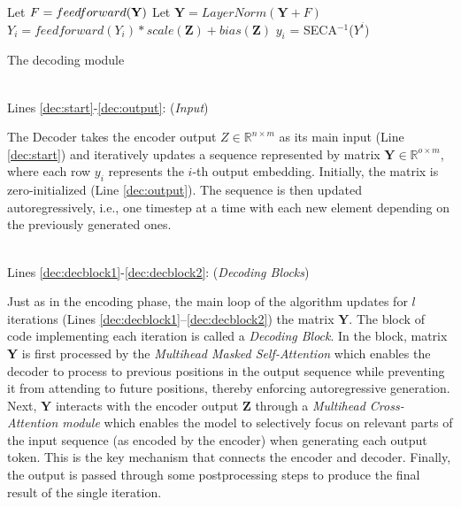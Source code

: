 \documentclass[algorithms,article,submit,pdftex,moreauthors]{Definitions/mdpi}
\begin{document}
\begin{algorithm2e}
{{                \label{dec:norm2}
                Let $F = feedforward({\bf Y})$\;
                \label{dec:ffn}
                Let $\textbf{Y} = LayerNorm(\textbf{Y} + F)$\;
                \label{dec:norm3}
            } \label{dec:decblock2}
            $Y_i = feedforward(Y_i)  * scale(\textbf{Z}) + bias(\textbf{Z})$\; \label{dec:finalproj}
            $y_i$ = SECA$^{-1}$($Y^i$) \;
        } \label{dec:outer2}                     
    	\caption{The decoding module} 
    \label{algo:decoding}
\end{algorithm2e}

~\\Lines \ref{dec:start}-\ref{dec:output}: (\textit{Input})

The Decoder takes the encoder output $Z \in \mathbb{R}^{n \times m}$ as its main input (Line \ref{dec:start}) and iteratively updates a sequence represented by matrix $\textbf{Y} \in \mathbb{R}^{o \times m}$, where each row $y_i$ represents the $i$-th output embedding. Initially, the matrix is zero-initialized (Line \ref{dec:output}). The sequence is then updated autoregressively, i.e., one timestep at a time with each new element depending on the previously generated ones.

~\\Lines \ref{dec:decblock1}-\ref{dec:decblock2}: (\textit{Decoding Blocks})

Just as in the encoding phase, the main loop of the algorithm updates for $l$ iterations (Lines \ref{dec:decblock1}–\ref{dec:decblock2}) the matrix $\textbf{Y}$. The block of code implementing each iteration is called a \textit{Decoding Block}.
In the block, matrix {\bf Y} is first processed by the {\em Multihead Masked Self-Attention} which enables the decoder to process to previous positions in the output sequence while preventing it from attending to future positions, thereby enforcing autoregressive generation.
Next, $\mathbf{Y}$ interacts with the encoder output $\mathbf{Z}$ through a {\em Multihead Cross-Attention module} which enables the model to selectively focus on relevant parts of the input sequence (as encoded by the encoder) when generating each output token. This is the key mechanism that connects the encoder and decoder.
Finally, the output is passed through some postprocessing steps to produce the final result of the single iteration.
\end{document}
